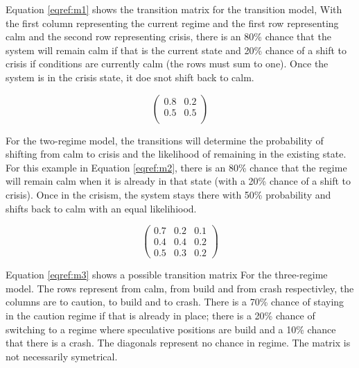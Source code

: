 \documentclass[12pt, a4paper, oneside]{article} %
\begin{document}
Equation \ref{eqref:m1} shows the transition matrix for the transition model, With the first column representing the current regime and the first row representing calm and the second row representing crisis, there is an 80\% chance that the system will remain calm if that is the current state and 20\% chance of a shift to crisis if conditions are currently calm (the rows must sum to one).   Once the system is in the crisis state, it doe snot shift back to calm. 

\begin{equation}
\label{eqref:m2}
\begin{pmatrix}
0.8 & 0.2 \\
0.5 & 0.5 \\
\end{pmatrix}
\end{equation}

For the two-regime model, the transitions will determine the probability of shifting from calm to crisis and the likelihood of remaining in the existing state.  For this example in Equation \ref{eqref:m2}, there is an 80\% chance that the regime will remain calm when it is already in that state (with a 20\% chance of a shift to crisis).  Once in the crisism, the system stays there with 50\% probability and shifts back to calm with an equal likelihiood.  

\begin{equation}
\label{eqref:m3}
\begin{pmatrix}
0.7 & 0.2 & 0.1\\
0.4 & 0.4 & 0.2\\
0.5 & 0.3 & 0.2
\end{pmatrix}
\end{equation}

Equation \ref{eqref:m3} shows a possible transition matrix For the three-regime model.  The rows represent from calm, from build and from crash respectivley, the columns are to caution, to build and to crash.  There is a 70\% chance of staying in the caution regime if that is already in place; there is a 20\% chance of switching to a regime where speculative positions are build and a 10\% chance that there is a crash.  The diagonals represent no chance in regime.  The matrix is not necessarily symetrical. 

\end{document}

